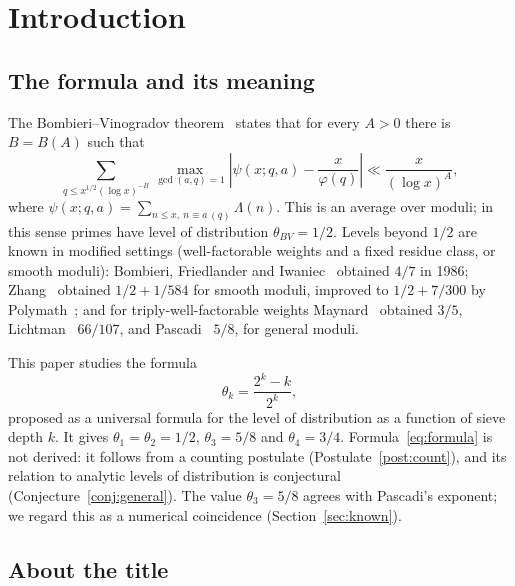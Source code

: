 \documentclass[12pt]{amsart}
\theoremstyle{plain}
\theoremstyle{definition}
\theoremstyle{remark}
\newcommand{\thetaBV}{\theta_{BV}}
\newcommand{\thetak}{\theta_k}
\begin{document}
\tableofcontents

\section{Introduction}

\subsection{The formula and its meaning}

The Bombieri--Vinogradov theorem~\cite{Bombieri1965,Vinogradov1965} states
that for every $A > 0$ there is $B = B(A)$ such that
\[
  \sum_{q \leq x^{1/2}(\log x)^{-B}} \max_{\gcd(a,q)=1}
  \left| \psi(x;q,a) - \frac{x}{\varphi(q)} \right| \ll \frac{x}{(\log x)^A},
\]
where $\psi(x;q,a) = \sum_{n \leq x,\ n \equiv a\,(q)} \Lambda(n)$. This is an
average over moduli; in this sense primes have level of distribution
$\thetaBV = 1/2$. Levels beyond $1/2$ are known in modified settings
(well-factorable weights and a fixed residue class, or smooth moduli):
Bombieri, Friedlander and Iwaniec~\cite{BFI1986} obtained $4/7$ in 1986;
Zhang~\cite{Zhang2014} obtained $1/2 + 1/584$ for smooth moduli, improved to
$1/2 + 7/300$ by Polymath~\cite{Polymath2014}; and for triply-well-factorable
weights Maynard~\cite{Maynard2020} obtained $3/5$, Lichtman~\cite{Lichtman2023}
$66/107$, and Pascadi~\cite{Pascadi2025} $5/8$, for general moduli.

This paper studies the formula
\begin{equation}
\label{eq:formula}
  \thetak = \frac{2^k - k}{2^k},
\end{equation}
proposed as a universal formula for the level of distribution as a function of
sieve depth $k$. It gives $\theta_1 = \theta_2 = 1/2$, $\theta_3 = 5/8$ and
$\theta_4 = 3/4$. Formula~\eqref{eq:formula} is not derived: it follows from a
counting postulate (Postulate~\ref{post:count}), and its relation to analytic
levels of distribution is conjectural (Conjecture~\ref{conj:general}). The value
$\theta_3 = 5/8$ agrees with Pascadi's exponent; we regard this as a numerical
coincidence (Section~\ref{sec:known}).

\subsection{About the title}
\label{sec:title}
\end{document}
